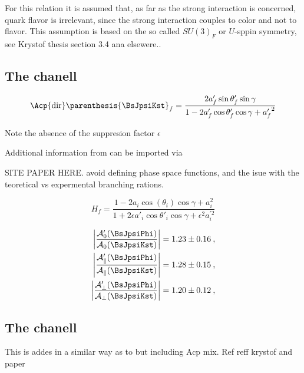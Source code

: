 

For this relation it is assumed that, as far as the strong interaction is concerned, quark flavor is irrelevant,
since the strong interaction couples to color and not to flavor. This assumption is based on the so called $SU(3)_F$ or $U$-sppin symmetry,
see {\color{red} Krystof thesis section 3.4 ana elsewere.}.


\subsection{The \BsJpsiKst chanell}

\begin{equation}
  \Acp{\rm dir}\parenthesis{\BsJpsiKst}_f = \frac{ 2a'_f \sin\theta'_f \sin\gamma} {1 - 2a'_f \cos\theta'_f \cos\gamma +  {a'_f}^{2}}
  \label{bsjpsikst_peng_acp_obs}
\end{equation}

Note the absence of the suppresion factor $\epsilon$

Additional information from \BsJpsiKst can be imported via


{\color{red} SITE PAPER HERE. avoid defining phase space functions, and the isue with the teoretical vs expermental branching rations.}

\begin{equation}
  H_f = \frac{1-2a_i \cos(\theta_i) \cos\gamma+a_i^{2}}{1+2\epsilon a'_i \cos\theta'_i\cos\gamma +\epsilon^2 a_i^{\prime 2}}
\label{bsjpsikst_Hobs_param}
\end{equation}

\begin{align}
\left|\frac{\mathcal{A}'_0(\BsJpsiPhi)}{\mathcal{A}_0(\BsJpsiKst)}\right| & = 1.23 \pm 0.16\:,\label{Eq:AmpRat_JpsiKstar_long}\\
\left|\frac{\mathcal{A}'_{\parallel}(\BsJpsiPhi)}{\mathcal{A}_{\parallel}(\BsJpsiKst)}\right| & = 1.28 \pm 0.15\:,\\
\left|\frac{\mathcal{A}'_{\perp}(\BsJpsiPhi)}{\mathcal{A}_{\perp}(\BsJpsiKst)}\right| & = 1.20 \pm 0.12\:,\label{Eq:AmpRat_JpsiKstar_perp}
\end{align}


\subsection{The \BsJpsiRho chanell}

This is addes in a similar way as to \BsJpsiKst but including Acp mix.
Ref reff krystof and paper

